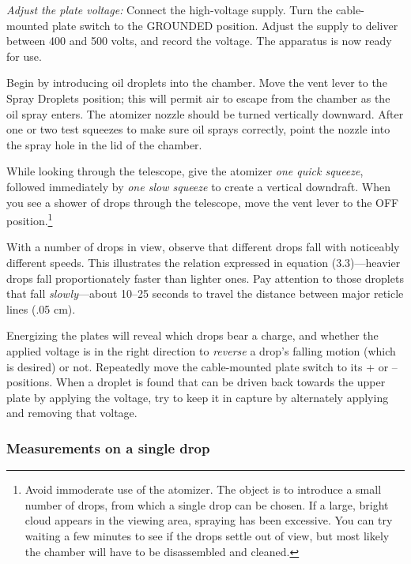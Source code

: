\emph{Adjust the plate voltage:} Connect the high-voltage supply. Turn
the cable-mounted plate switch to the GROUNDED position. Adjust the
supply to deliver between 400 and 500 volts, and record the voltage. The
apparatus is now ready for use.

Begin by introducing oil droplets into the chamber. Move the vent lever
to the Spray Droplets position; this will permit air to escape from the
chamber as the oil spray enters. The atomizer nozzle should be turned
vertically downward. After one or two test squeezes to make sure oil
sprays correctly, point the nozzle into the spray hole in the lid of the
chamber.

While looking through the telescope, give the atomizer \emph{one quick
squeeze}, followed im\-me\-di\-ate\-ly by \emph{one slow squeeze} to create a
vertical downdraft. When you see a shower of drops through the
telescope, move the vent lever to the OFF po\-si\-tion.\footnote{Avoid
  immoderate use of the atomizer. The object is to introduce a small
  number of drops, from which a single drop can be chosen. If a large,
  bright cloud appears in the viewing area, spraying has been excessive.
  You can try waiting a few minutes to see if the drops settle out of
  view, but most likely the chamber will have to be disassembled and
  cleaned.}

With a number of drops in view, observe that different drops fall with
noticeably different speeds. This illustrates the relation expressed in
equation (3.3)---heavier drops fall proportionately faster than lighter
ones. Pay attention to those droplets that fall \emph{slowly}---about
10--25 seconds to travel the distance between major reticle lines (.05
cm).

Energizing the plates will reveal which drops bear a charge, and whether
the applied voltage is in the right direction to \emph{reverse} a drop's
falling motion (which is desired) or not. Repeatedly move the
cable-mounted plate switch to its + or -- positions. When a droplet is
found that can be driven back towards the upper plate by applying the
voltage, try to keep it in capture by alternately applying and removing
that voltage.

\subsubsection*{Measurements on a single drop}

